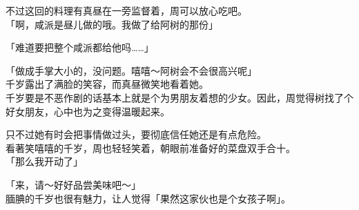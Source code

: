不过这回的料理有真昼在一旁监督着，周可以放心吃吧。\\

「啊，咸派是昼儿做的哦。我做了给阿树的那份」

「难道要把整个咸派都给他吗……」

「做成手掌大小的，没问题。嘻嘻～阿树会不会很高兴呢」\\

千岁露出了满脸的笑容，而真昼微笑地看着她。\\

千岁要是不恶作剧的话基本上就是个为男朋友着想的少女。因此，周觉得树找了个好女朋友，心中也为之变得温暖起来。

只不过她有时会把事情做过头，要彻底信任她还是有点危险。\\

看著笑嘻嘻的千岁，周也轻轻笑着，朝眼前准备好的菜盘双手合十。\\

「那么我开动了」

「来，请～好好品尝美味吧～」\\

腼腆的千岁也很有魅力，让人觉得「果然这家伙也是个女孩子啊」。

